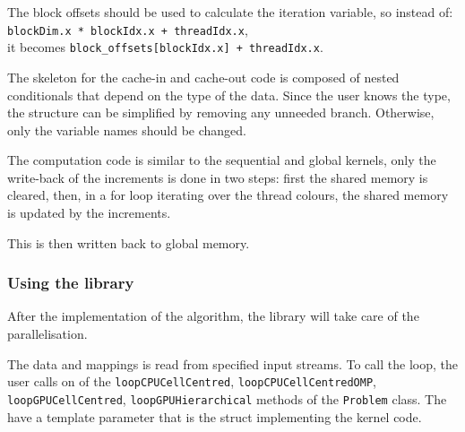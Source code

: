 The block offsets should be used to calculate the iteration variable, so instead
of: \lstinline!blockDim.x * blockIdx.x + threadIdx.x!, \\
\noindent it becomes \lstinline!block_offsets[blockIdx.x] + threadIdx.x!.

The skeleton for the cache-in and cache-out code is composed of nested
conditionals that depend on the type of the data. Since the user knows the type,
the structure can be simplified by removing any unneeded branch. Otherwise, only
the variable names should be changed.

The computation code is similar to the sequential and global kernels, only the
write-back of the increments is done in two steps: first the shared memory is
cleared, then, in a for loop iterating over the thread colours, the shared
memory is updated by the increments.

This is then written back to global memory.

\subsubsection{Using the library}

After the implementation of the algorithm, the library will take care of the
parallelisation.

The data and mappings is read from specified input streams. To call the loop,
the user calls on of the \lstinline!loopCPUCellCentred!,
\lstinline!loopCPUCellCentredOMP!, \lstinline!loopGPUCellCentred!,
\lstinline!loopGPUHierarchical! methods of the \lstinline!Problem! class. The
have a template parameter that is the struct implementing the kernel code.
